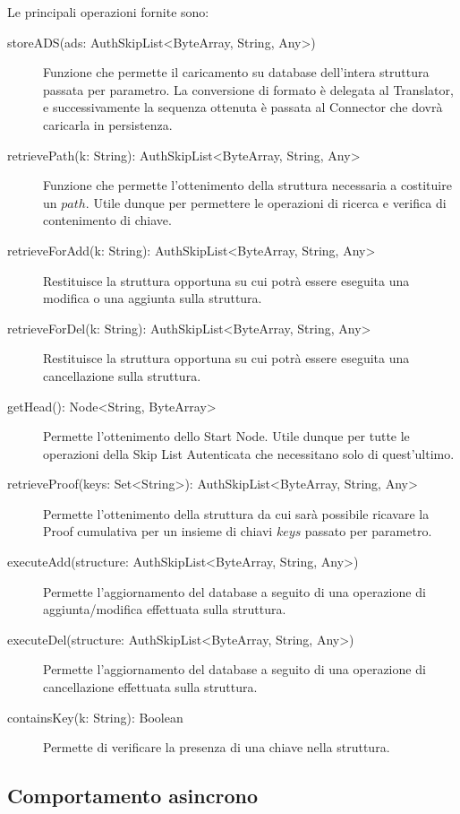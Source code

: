 		Le principali operazioni fornite sono:
		\begin{description}
			\item[storeADS(ads: AuthSkipList<ByteArray, String, Any>)] Funzione che permette il caricamento su database dell'intera struttura passata per parametro. La conversione di formato è delegata al Translator, e successivamente la sequenza ottenuta è passata al Connector che dovrà caricarla in persistenza.
			\item[retrievePath(k: String): AuthSkipList<ByteArray, String, Any>] Funzione che permette l'ottenimento della struttura necessaria a costituire un $ path $. Utile dunque per permettere le operazioni di ricerca e verifica di contenimento di chiave.
			\item[retrieveForAdd(k: String): AuthSkipList<ByteArray, String, Any>] Restituisce la struttura opportuna su cui potrà essere eseguita una modifica o una aggiunta sulla struttura.
			\item[retrieveForDel(k: String): AuthSkipList<ByteArray, String, Any>] Restituisce la struttura opportuna su cui potrà essere eseguita una cancellazione sulla struttura.
			\item[getHead(): Node<String, ByteArray>] Permette l'ottenimento dello Start Node. Utile dunque per tutte le operazioni della Skip List Autenticata che necessitano solo di quest'ultimo.
			\item[retrieveProof(keys: Set<String>): AuthSkipList<ByteArray, String, Any>] Permette l'ottenimento della struttura da cui sarà possibile ricavare la Proof cumulativa per un insieme di chiavi $ keys $ passato per parametro.
			\item[executeAdd(structure: AuthSkipList<ByteArray, String, Any>)] Permette l'aggiornamento del database a seguito di una operazione di aggiunta/modifica effettuata sulla struttura.
			\item[executeDel(structure: AuthSkipList<ByteArray, String, Any>)] Permette l'aggiornamento del database a seguito di una operazione di cancellazione effettuata sulla struttura.		
			\item[containsKey(k: String): Boolean] Permette di verificare la presenza di una chiave nella struttura.
		\end{description}
		
	\subsection{Comportamento asincrono}
	
